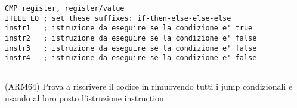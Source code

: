 \begin{lstlisting}[caption=ARM (\ThumbMode),style=customasmARM]
CMP register, register/value
ITEEE EQ ; set these suffixes: if-then-else-else-else
instr1   ; istruzione da eseguire se la condizione e' true
instr2   ; istruzione da eseguire se la condizione e' false
instr3   ; istruzione da eseguire se la condizione e' false
instr4   ; istruzione da eseguire se la condizione e' false
\end{lstlisting}

\subsection{\Esercizio}

(ARM64) Prova a riscrivere il codice in  rimuovendo tutti i jump condizionali e usando al loro posto l'istruzione  instruction.
